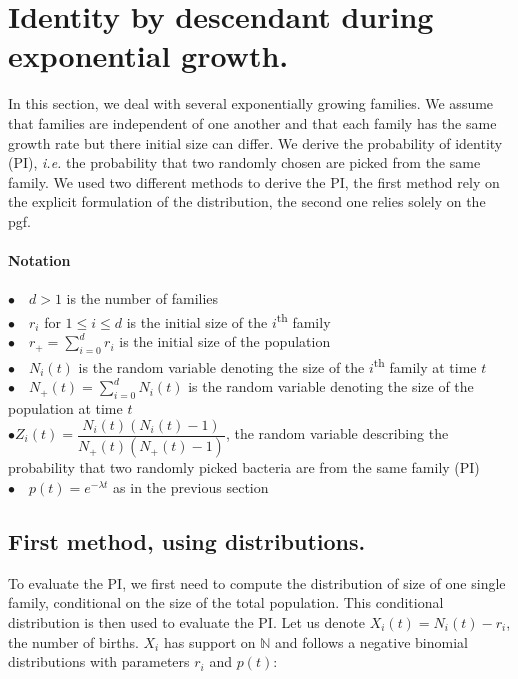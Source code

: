 \documentclass{article}
\begin{document}
 
 
\section{Identity by descendant during exponential growth.}
 In this section, we deal with several exponentially growing families. We assume that families are independent of one another and that each family has the same growth rate but there initial size can differ. We derive the probability of identity (PI), \textit{i.e.} the probability that two randomly chosen are picked from the same family. We used two different methods to derive the PI, the first method rely on the explicit formulation of the distribution, the second one relies solely on the pgf.
 \\
  \paragraph{Notation} $ $\\
 $\bullet \quad d>1$ is the number of families\\
 $\bullet \quad r_i $ for $1 \leq i \leq d$ is the initial size of the $i$\textsuperscript{th} family\\
 $\displaystyle \bullet \quad r_+=\sum_{i=0}^d r_i$ is the initial size of the population \\
 $\bullet \quad N_i(t) $ is the random variable denoting the size of the $i$\textsuperscript{th} family at time $t$ \\
 $\displaystyle \bullet \quad N_+(t)=\sum_{i=0}^d N_i(t)$ is the random variable denoting the size of the population at time $t$ \\
 $\bullet Z_i(t)=\dfrac{N_i(t)(N_i(t)-1)}{N_+(t)( N_+(t)-1 ) }$, the random variable describing the probability that two randomly picked bacteria are from the same family (PI)\\
 $\bullet \quad p(t)=e^{-\lambda t} $ as in the previous section\\
 
 \subsection{First method, using distributions.}
  To evaluate the PI, we first need to compute the distribution of size of one single family, conditional on the size of the total population. This conditional distribution is then used to evaluate the PI.
 Let us denote $X_i(t)=N_i(t)-r_i$, the number of births. $X_i$ has support on $\mathbb{N}$ and follows a negative binomial distributions with parameters $r_i$ and $p(t)$:
\end{document}
